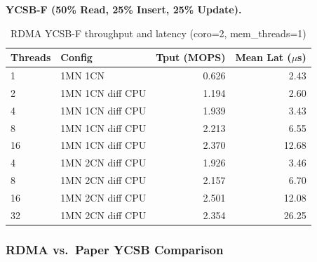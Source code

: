 \documentclass[conference]{IEEEtran}
\begin{document}
\textbf{YCSB-F (50\% Read, 25\% Insert, 25\% Update).}

\begin{table}[H]
\centering
\caption{RDMA YCSB-F throughput and latency (coro=2, mem\_threads=1)}
\label{tab:rdma-ycsbf}
\small
\begin{tabular}{@{}llrr@{}}
\toprule
\textbf{Threads} & \textbf{Config} & \textbf{Tput (MOPS)} & \textbf{Mean Lat ($\mu$s)} \\
\midrule
1  & 1MN 1CN             & 0.626 & 2.43 \\
2  & 1MN 1CN diff CPU    & 1.194 & 2.60 \\
4  & 1MN 1CN diff CPU    & 1.939 & 3.43 \\
8  & 1MN 1CN diff CPU    & 2.213 & 6.55 \\
16 & 1MN 1CN diff CPU    & 2.370 & 12.68 \\
\midrule
4  & 1MN 2CN diff CPU    & 1.926 & 3.46 \\
8  & 1MN 2CN diff CPU    & 2.157 & 6.70 \\
16 & 1MN 2CN diff CPU    & 2.501 & 12.08 \\
32 & 1MN 2CN diff CPU    & 2.354 & 26.25 \\
\bottomrule
\end{tabular}
\end{table}

\subsubsection{RDMA vs.\ Paper YCSB Comparison}
\end{document}
